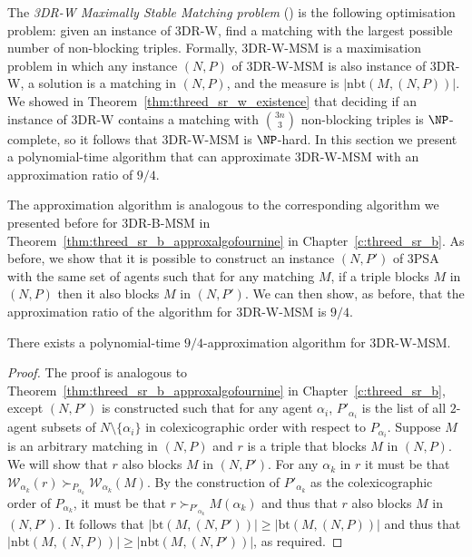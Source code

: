 The \emph{3DR-W Maximally Stable Matching problem} () is the following optimisation problem: given an instance of 3DR-W, find a matching with the largest possible number of non-blocking triples. Formally, 3DR-W-MSM is a maximisation problem in which any instance $(N, P)$ of 3DR-W-MSM is also instance of 3DR-W, a solution is a matching in $(N, P)$, and the measure is $|\textrm{nbt}(M, (N, P))|$. We showed in Theorem~\ref{thm:threed_sr_w_existence} that deciding if an instance of 3DR-W contains a matching with $\binom{3n}{3}$ non-blocking triples is $\NP$-complete, so it follows that 3DR-W-MSM is $\NP$-hard. In this section we present a polynomial-time algorithm that can approximate 3DR-W-MSM with an approximation ratio of $9/4$. 

The approximation algorithm is analogous to the corresponding algorithm we presented before for 3DR-B-MSM in Theorem~\ref{thm:threed_sr_b_approxalgofournine} in Chapter~\ref{c:threed_sr_b}. As before, we show that it is possible to construct an instance $(N, P')$ of 3PSA with the same set of agents such that for any matching $M$, if a triple blocks $M$ in $(N, P)$ then it also blocks $M$ in $(N, P')$. We can then show, as before, that the approximation ratio of the algorithm for 3DR-W-MSM is $9/4$.

\begin{thm}
\label{thm:threed_sr_w_approxalgofournine}
There exists a polynomial-time $9/4$-approximation algorithm for 3DR-W-MSM.
\end{thm}
\begin{proof}
The proof is analogous to Theorem~\ref{thm:threed_sr_b_approxalgofournine} in Chapter~\ref{c:threed_sr_b}, except $(N, P')$ is constructed such that for any agent $\alpha_i$, $P'_{\alpha_i}$ is the list of all $2$-agent subsets of $N \setminus \{ \alpha_i \}$ in colexicographic order \cite{combinatorialwest} with respect to $P_{\alpha_i}$. Suppose $M$ is an arbitrary matching in $(N, P)$ and $r$ is a triple that blocks $M$ in $(N, P)$. We will show that $r$ also blocks $M$ in $(N, P')$. For any $\alpha_k$ in $r$ it must be that $\mathscr{W}_{\alpha_k}(r) \succ_{P_{\alpha_k}} \mathscr{W}_{\alpha_k}(M)$. By the construction of $P'_{\alpha_k}$ as the colexicographic order of $P_{\alpha_k}$, it must be that $r \succ_{P'_{\alpha_k}} M(\alpha_k)$ and thus that $r$ also blocks $M$ in $(N, P')$. It follows that $|\textrm{bt}(M, (N, P'))| \geq |\textrm{bt}(M, (N, P))|$ and thus that $|\textrm{nbt}(M, (N, P))| \geq |\textrm{nbt}(M, (N, P'))|$, as required.
\end{proof}